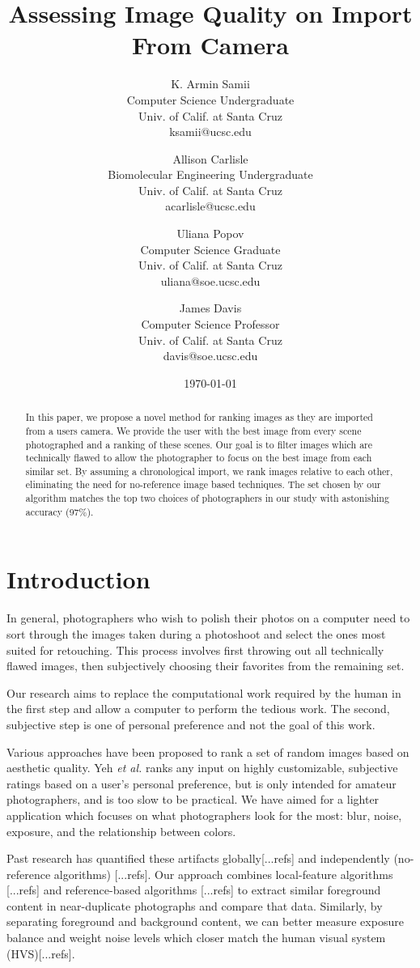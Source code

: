 \documentclass[twocolumn]{article}
\title{
   Assessing Image Quality on Import From Camera
} %
\author{
   K. Armin Samii\\
   Computer Science Undergraduate\\
   Univ. of Calif. at Santa Cruz\\
   ksamii@ucsc.edu
  \and
   Allison Carlisle\\
   Biomolecular Engineering Undergraduate\\
   Univ. of Calif. at Santa Cruz\\
   acarlisle@ucsc.edu
  \and
   Uliana Popov\\
   Computer Science Graduate\\
   Univ. of Calif. at Santa Cruz\\
   uliana@soe.ucsc.edu
  \and
   James Davis\\
   Computer Science Professor\\
   Univ. of Calif. at Santa Cruz\\
   davis@soe.ucsc.edu
}
\date{\today}
\begin{document}
\maketitle

\begin{abstract}
In this paper, we propose a novel method for ranking images as they are imported from a users camera. We provide the user with the best image from every scene photographed and a ranking of these scenes. Our goal is to filter images which are technically flawed to allow the photographer to focus on the best image from each similar set. By assuming a chronological import, we rank images relative to each other, eliminating the need for no-reference image based techniques. The set chosen by our algorithm matches the top two choices of photographers in our study with astonishing accuracy (97\%).
\end{abstract}

\section{Introduction}
In general, photographers who wish to polish their photos on a computer need to sort through the images taken during a photoshoot and select the ones most suited for retouching. This process involves first throwing out all technically flawed images, then subjectively choosing their favorites from the remaining set.

Our research aims to replace the computational work required by the human in the first step and allow a computer to perform the tedious work. The second, subjective step is one of personal preference and not the goal of this work.

Various approaches have been proposed to rank a set of random images based on aesthetic quality. Yeh \textit{et al.}\cite{Yeh:2010:PPR:1873951.1873963} ranks any input on highly customizable, subjective ratings based on a user's personal preference, but is only intended for amateur photographers, and is too slow to be practical. We have aimed for a lighter application which focuses on what photographers look for the most: blur, noise, exposure, and the relationship between colors.

Past research has quantified these artifacts globally[...refs] and independently (no-reference algorithms) [...refs]. Our approach combines local-feature algorithms [...refs] and reference-based algorithms [...refs] to extract similar foreground content in near-duplicate photographs and compare that data. Similarly, by separating foreground and background content, we can better measure exposure balance and weight noise levels which closer match the human visual system (HVS)[...refs].
\end{document}
